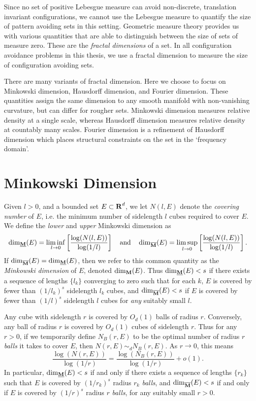 Since no set of positive Lebesgue measure can avoid non-discrete, translation invariant configurations, we cannot use the Lebesgue measure to quantify the size of pattern avoiding sets in this setting. Geometric measure theory provides us with various quantities that are able to distinguish between the size of sets of measure zero. These are the \emph{fractal dimensions} of a set. In all configuration avoidance problems in this thesis, we use a fractal dimension to measure the size of configuration avoiding sets.

There are many variants of fractal dimension. Here we choose to focus on Minkowski dimension, Hausdorff dimension, and Fourier dimension. These quantities assign the same dimension to any smooth manifold with non-vanishing curvature, but can differ for rougher sets. Minkowski dimension measures relative density at a single scale, whereas Hausdorff dimension measures relative density at countably many scales. Fourier dimension is a refinement of Hausdorff dimension which places structural constraints on the set in the `frequency domain'.









\section{Minkowski Dimension}

Given $l > 0$, and a bounded set $E \subset \RR^d$, we let $N(l,E)$ denote the \emph{covering number} of $E$, i.e. the minimum number of sidelength $l$ cubes required to cover $E$. We define the \emph{lower} and \emph{upper} Minkowski dimension as
%
\[ \lowminkdim(E) = \liminf_{l \to 0} \left[ \frac{\log(N(l,E))}{\log(1/l)} \right] \quad\text{and}\quad \upminkdim(E) = \limsup_{l \to 0} \left[ \frac{\log(N(l,E))}{\log(1/l)} \right]. \]
%
If $\upminkdim(E) = \lowminkdim(E)$, then we refer to this common quantity as the \emph{Minkowski dimension} of $E$, denoted $\minkdim(E)$. Thus $\lowminkdim(E) < s$ if there exists a sequence of lengths $\{ l_k \}$ converging to zero such that for each $k$, $E$ is covered by fewer than $(1/l_k)^s$ sidelength $l_k$ cubes, and $\upminkdim(E) < s$ if $E$ is covered by fewer than $(1/l)^s$ sidelength $l$ cubes for \emph{any} suitably small $l$.

\begin{remark}
	Any cube with sidelength $r$ is covered by $O_d(1)$ balls of radius $r$. Conversely, any ball of radius $r$ is covered by $O_d(1)$ cubes of sidelength $r$. Thus for any $r > 0$, if we temporarily define $N_B(r,E)$ to be the optimal number of radius $r$ \emph{balls} it takes to cover $E$, then $N(r,E) \sim_d N_B(r,E)$. As $r \to 0$, this means
	\[ \frac{\log(N(r,E))}{\log(1/r)} = \frac{\log(N_B(r,E))}{\log(1/r)} + o(1). \]
	In particular, $\lowminkdim(E) < s$ if and only if there exists a sequence of lengths $\{ r_k \}$ such that $E$ is covered by $(1/r_k)^s$ radius $r_k$ \emph{balls}, and $\upminkdim(E) < s$ if and only if $E$ is covered by $(1/r)^s$ radius $r$ \emph{balls}, for any suitably small $r > 0$.
\end{remark}

